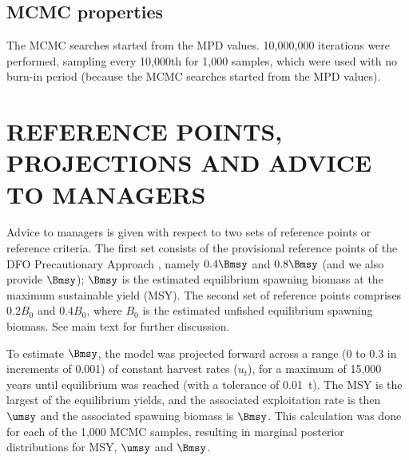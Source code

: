 \vsd
\vsd   %

\subsection{MCMC properties}

The MCMC searches started from the MPD values. 10,000,000 iterations were performed, sampling every 10,000th for 1,000 samples, which were used with no burn-in period (because the MCMC searches started from the MPD values).  

\section{REFERENCE POINTS, PROJECTIONS AND ADVICE TO MANAGERS}

Advice to managers is given with respect to two sets of reference points or reference criteria. The first set consists of the provisional reference points of the DFO Precautionary Approach \citep{dfo06}, namely $0.4 \Bmsy$ and $0.8 \Bmsy$ (and we also provide $\Bmsy$); $\Bmsy$ is the estimated equilibrium spawning biomass at the maximum sustainable yield (MSY). The second set of reference points comprises $0.2 B_0$ and $0.4 B_0$, where $B_0$ is the estimated unfished equilibrium spawning biomass. See main text for further discussion.

To estimate $\Bmsy$, the model was projected forward across a range (0 to 0.3 in increments of 0.001) of constant harvest rates ($u_t$), for a maximum of 15,000 years until equilibrium was reached (with a tolerance of 0.01~t). The MSY is the largest of the equilibrium yields, and the associated exploitation rate is then $\umsy$ and the associated spawning biomass is $\Bmsy$. This calculation was done for each of the 1,000 MCMC samples, resulting in marginal posterior distributions for MSY, $\umsy$ and $\Bmsy$. 


